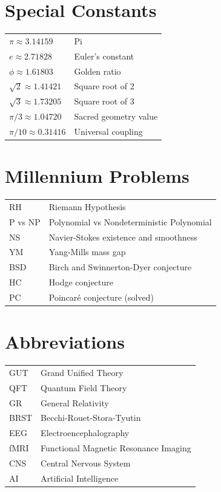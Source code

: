 \section{Special Constants}

\begin{tabular}{ll}
$\pi \approx 3.14159$ & Pi \\
$e \approx 2.71828$ & Euler's constant \\
$\phi \approx 1.61803$ & Golden ratio \\
$\sqrt{2} \approx 1.41421$ & Square root of 2 \\
$\sqrt{3} \approx 1.73205$ & Square root of 3 \\
$\pi/3 \approx 1.04720$ & Sacred geometry value \\
$\pi/10 \approx 0.31416$ & Universal coupling \\
\end{tabular}

\section{Millennium Problems}

\begin{tabular}{ll}
RH & Riemann Hypothesis \\
P vs NP & Polynomial vs Nondeterministic Polynomial \\
NS & Navier-Stokes existence and smoothness \\
YM & Yang-Mills mass gap \\
BSD & Birch and Swinnerton-Dyer conjecture \\
HC & Hodge conjecture \\
PC & Poincaré conjecture (solved) \\
\end{tabular}

\section{Abbreviations}

\begin{tabular}{ll}
GUT & Grand Unified Theory \\
QFT & Quantum Field Theory \\
GR & General Relativity \\
BRST & Becchi-Rouet-Stora-Tyutin \\
EEG & Electroencephalography \\
fMRI & Functional Magnetic Resonance Imaging \\
CNS & Central Nervous System \\
AI & Artificial Intelligence \\
\end{tabular}

